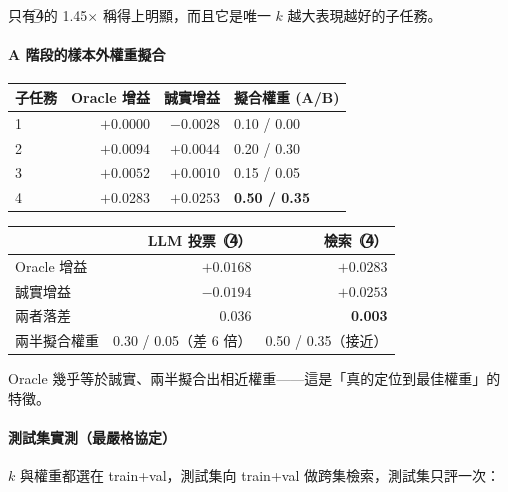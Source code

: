 \documentclass[11pt,a4paper]{ctexart}
\begin{document}
只有\textcircled{4}的 1.45$\times$ 稱得上明顯，而且它是唯一 $k$ 越大表現越好的子任務。

\paragraph{A 階段的樣本外權重擬合}\mbox{}\par

\begin{table}[h]
\centering\small
\begin{tabular}{@{}lrrl@{}}
\toprule
子任務 & Oracle 增益 & 誠實增益 & 擬合權重 (A/B) \\
\midrule
\textcircled{1} & $+0.0000$ & $-0.0028$ & 0.10 / 0.00 \\
\textcircled{2} & $+0.0094$ & $+0.0044$ & 0.20 / 0.30 \\
\textcircled{3} & $+0.0052$ & $+0.0010$ & 0.15 / 0.05 \\
\rowcolor{green!10}
\textcircled{4} & $+0.0283$ & $\mathbf{+0.0253}$ & \textbf{0.50 / 0.35} \\
\bottomrule
\end{tabular}
\end{table}

\begin{tcolorbox}[colback=green!5, colframe=green!45, title=與假設 L 的訊號完全不同]
\begin{tabular}{@{}lrr@{}}
 & LLM 投票（\textcircled{4}） & 檢索（\textcircled{4}） \\
\midrule
Oracle 增益 & $+0.0168$ & $+0.0283$ \\
誠實增益 & $\mathbf{-0.0194}$ & $\mathbf{+0.0253}$ \\
兩者落差 & 0.036 & \textbf{0.003} \\
兩半擬合權重 & 0.30 / 0.05（差 6 倍） & 0.50 / 0.35（接近） \\
\end{tabular}

\medskip
Oracle 幾乎等於誠實、兩半擬合出相近權重——這是「真的定位到最佳權重」的特徵。
\end{tcolorbox}

\paragraph{測試集實測（最嚴格協定）}
$k$ 與權重都選在 train+val，測試集向 train+val 做跨集檢索，測試集只評一次：
\end{document}
